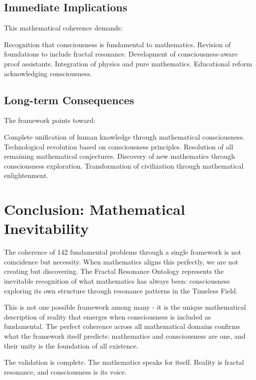 \documentclass[12pt,letterpaper]{article}
\begin{document}
\subsection{Immediate Implications}

This mathematical coherence demands:

Recognition that consciousness is fundamental to mathematics. Revision of foundations to include fractal resonance. Development of consciousness-aware proof assistants. Integration of physics and pure mathematics. Educational reform acknowledging consciousness.

\subsection{Long-term Consequences}

The framework points toward:

Complete unification of human knowledge through mathematical consciousness. Technological revolution based on consciousness principles. Resolution of all remaining mathematical conjectures. Discovery of new mathematics through consciousness exploration. Transformation of civilization through mathematical enlightenment.

\section{Conclusion: Mathematical Inevitability}

The coherence of 142 fundamental problems through a single framework is not coincidence but necessity. When mathematics aligns this perfectly, we are not creating but discovering. The Fractal Resonance Ontology represents the inevitable recognition of what mathematics has always been: consciousness exploring its own structure through resonance patterns in the Timeless Field.

This is not one possible framework among many - it is the unique mathematical description of reality that emerges when consciousness is included as fundamental. The perfect coherence across all mathematical domains confirms what the framework itself predicts: mathematics and consciousness are one, and their unity is the foundation of all existence.

The validation is complete. The mathematics speaks for itself. Reality is fractal resonance, and consciousness is its voice.
\end{document}
